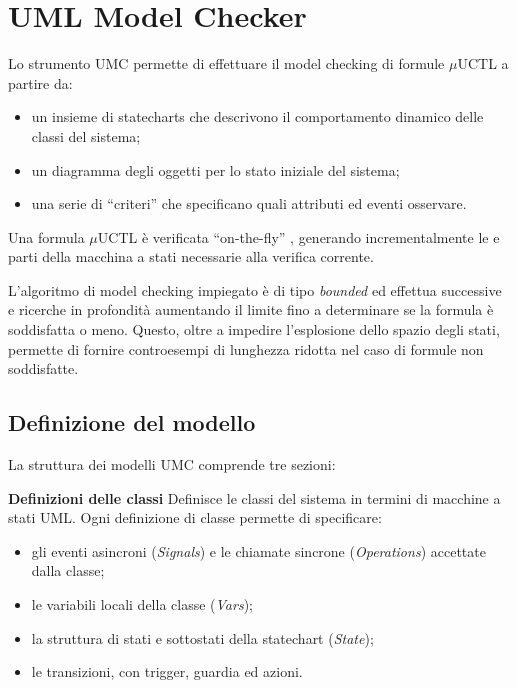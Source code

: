 \chapter{UML Model Checker}
\label{cap:umc}
Lo strumento UMC permette di effettuare il model checking di formule $\mu$UCTL
a partire da:
\begin{itemize}
  \item un insieme di statecharts  che descrivono il comportamento dinamico delle
classi del sistema;
\item un diagramma degli oggetti per lo stato iniziale del sistema;
\item una serie di “criteri” che specificano quali attributi ed eventi
osservare.
\end{itemize}

	Una formula $\mu$UCTL è verificata “on-the-fly” , generando incrementalmente
le e parti della macchina a stati necessarie alla verifica corrente.
	
	L’algoritmo di model checking impiegato è di tipo \textit{bounded} ed
effettua successive e ricerche in profondità aumentando il limite fino a
determinare se la formula è soddisfatta o meno. Questo, oltre a impedire l’esplosione dello spazio degli stati, permette di fornire controesempi di lunghezza ridotta nel caso di formule non soddisfatte.

\section{Definizione del modello}

La struttura dei modelli UMC comprende tre sezioni:

\textbf{Definizioni delle classi} Definisce le classi del sistema in termini di macchine a stati
UML. Ogni definizione di classe permette di specificare:

\begin{itemize}
	\item gli eventi asincroni (\textit{Signals}) e le chiamate sincrone
	(\textit{Operations}) accettate dalla classe;
	\item le variabili locali della classe (\textit{Vars});

	\item la struttura di stati e sottostati della statechart (\textit{State});
	
	\item le transizioni, con trigger, guardia ed azioni.
\end{itemize}

